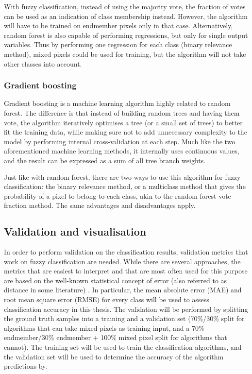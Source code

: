 \documentclass[a4paper,10pt]{article}
\begin{document}
With fuzzy classification, instead of using the majority vote, the fraction of votes can be used as an indication of class membership instead. However, the algorithm will have to be trained on endmember pixels only in that case. Alternatively, random forest is also capable of performing regressions, but only for single output variables. Thus by performing one regression for each class (binary relevance method), mixed pixels could be used for training, but the algorithm will not take other classes into account.

\subsubsection{Gradient boosting}

Gradient boosting is a machine learning algorithm highly related to random forest. The difference is that instead of building random trees and having them vote, the algorithm iteratively optimises a tree (or a small set of trees) to better fit the training data, while making sure not to add unnecessary complexity to the model by performing internal cross-validation at each step. Much like the two aforementioned machine learning methods, it internally uses continuous values, and the result can be expressed as a sum of all tree branch weights. \cite{friedman2001gradientboost}

Just like with random forest, there are two ways to use this algorithm for fuzzy classification: the binary relevance method, or a multiclass method that gives the probability of a pixel to belong to each class, akin to the random forest vote fraction method. The same advantages and disadvantages apply.

\subsection{Validation and visualisation}

In order to perform validation on the classification results, validation metrics that work on fuzzy classification are needed. While there are several approaches, the metrics that are easiest to interpret and that are most often used for this purpose are based on the well-known statistical concept of error (also referred to as distance in some literature) \cite{foody1996fuzzyevaluation}. In particular, the mean absolute error (MAE) and root mean square error (RMSE) for every class will be used to assess classification accuracy in this thesis. The validation will be performed by splitting the ground truth samples into a training and a validation set (70\%/30\% split for algorithms that can take mixed pixels as training input, and a 70\% endmember/30\% endmember + 100\% mixed pixel split for algorithms that cannot). The training set will be used to train the classification algorithms, and the validation set will be used to determine the accuracy of the algorithm predictions by:
\end{document}

